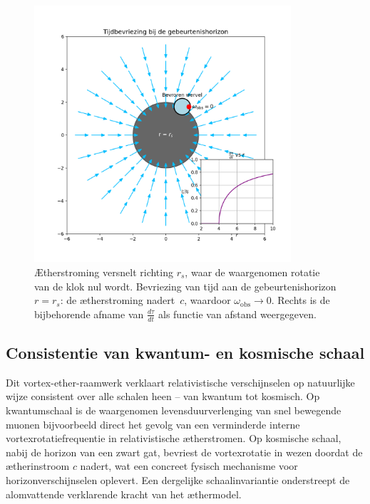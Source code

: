 \begin{figure}[htbp]
    \centering
    \includegraphics[width=0.85\textwidth]{images/10-HorizonTijdsbevriezing_nl}
    \caption{Ætherstroming versnelt richting $r_s$, waar de waargenomen rotatie van de klok nul wordt. Bevriezing van tijd aan de gebeurtenishorizon $r = r_s$: de ætherstroming nadert~$c$, waardoor $\omega_{\mathrm{obs}} \to 0$. Rechts is de bijbehorende afname van $\frac{d\tau}{dt}$ als functie van afstand weergegeven.}
    \label{fig:HorizonTijdsbevriezing}
\end{figure}

\subsection*{Consistentie van kwantum- en kosmische schaal}

Dit vortex-ether-raamwerk verklaart relativistische verschijnselen op natuurlijke wijze consistent over alle schalen heen – van kwantum tot kosmisch. Op kwantumschaal is de waargenomen levensduurverlenging van snel bewegende muonen bijvoorbeeld direct het gevolg van een verminderde interne vortexrotatiefrequentie in relativistische ætherstromen. Op kosmische schaal, nabij de horizon van een zwart gat, bevriest de vortexrotatie in wezen doordat de ætherinstroom $c$ nadert, wat een concreet fysisch mechanisme voor horizonverschijnselen oplevert. Een dergelijke schaalinvariantie onderstreept de alomvattende verklarende kracht van het æthermodel.

